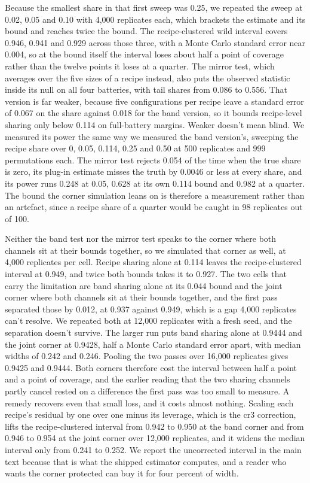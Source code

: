 Because the smallest share in that first sweep was 0.25, we repeated the sweep at 0.02, 0.05 and 0.10 with 4,000 replicates each, which brackets the estimate and its bound and reaches twice the bound. The recipe-clustered wild interval covers 0.946, 0.941 and 0.929 across those three, with a Monte Carlo standard error near 0.004, so at the bound itself the interval loses about half a point of coverage rather than the twelve points it loses at a quarter. The mirror test, which averages over the five sizes of a recipe instead, also puts the observed statistic inside its null on all four batteries, with tail shares from 0.086 to 0.556. That version is far weaker, because five configurations per recipe leave a standard error of 0.067 on the share against 0.018 for the band version, so it bounds recipe-level sharing only below 0.114 on full-battery margins. Weaker doesn't mean blind. We measured its power the same way we measured the band version's, sweeping the recipe share over 0, 0.05, 0.114, 0.25 and 0.50 at 500 replicates and 999 permutations each. The mirror test rejects 0.054 of the time when the true share is zero, its plug-in estimate misses the truth by 0.0046 or less at every share, and its power runs 0.248 at 0.05, 0.628 at its own 0.114 bound and 0.982 at a quarter. The bound the corner simulation leans on is therefore a measurement rather than an artefact, since a recipe share of a quarter would be caught in 98 replicates out of 100.

Neither the band test nor the mirror test speaks to the corner where both channels sit at their bounds together, so we simulated that corner as well, at 4,000 replicates per cell. Recipe sharing alone at 0.114 leaves the recipe-clustered interval at 0.949, and twice both bounds takes it to 0.927. The two cells that carry the limitation are band sharing alone at its 0.044 bound and the joint corner where both channels sit at their bounds together, and the first pass separated those by 0.012, at 0.937 against 0.949, which is a gap 4,000 replicates can't resolve. We repeated both at 12,000 replicates with a fresh seed, and the separation doesn't survive. The larger run puts band sharing alone at 0.9444 and the joint corner at 0.9428, half a Monte Carlo standard error apart, with median widths of 0.242 and 0.246. Pooling the two passes over 16,000 replicates gives 0.9425 and 0.9444. Both corners therefore cost the interval between half a point and a point of coverage, and the earlier reading that the two sharing channels partly cancel rested on a difference the first pass was too small to measure. A remedy recovers even that small loss, and it costs almost nothing. Scaling each recipe's residual by one over one minus its leverage, which is the cr3 correction, lifts the recipe-clustered interval from 0.942 to 0.950 at the band corner and from 0.946 to 0.954 at the joint corner over 12,000 replicates, and it widens the median interval only from 0.241 to 0.252. We report the uncorrected interval in the main text because that is what the shipped estimator computes, and a reader who wants the corner protected can buy it for four percent of width.

